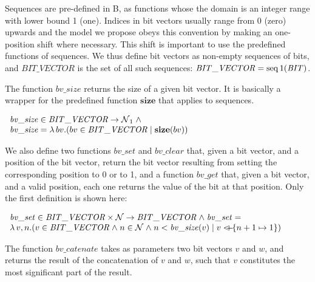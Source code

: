 \documentclass[11pt]{article} %
\begin{document}
Sequences are pre-defined in B, as functions whose the domain is an
integer range with lower bound 1 (one). Indices in bit vectors usually
range from 0 (zero) upwards and the model we propose obeys this
convention by making an one-position shift where necessary. This shift
is important to use the predefined functions of sequences. We thus
define bit vectors as non-empty sequences of bits, and
$\mathit{BIT\_VECTOR}$ is the set of all such sequences:
$\mathit{BIT\_VECTOR} = \mathop{\mathstrut{\rm seq}}\nolimits1(\mathit{BIT})$.

The function $\mathit{bv\_size}$ returns the size of a given bit vector. It is basically a wrapper for the
predefined function $\mathbf{size}$ that applies to sequences.

$
\begin{array}{l}
\mathit{bv\_size} \in \mathit{BIT\_VECTOR} \fun \nat_1 \land \\
\mathit{bv\_size} = \lambda bv . (bv \in \mathit{BIT\_VECTOR} \mid \mathbf{size}(bv))
\end{array}
$

We also define two functions $\mathit{bv\_set}$ and $\mathit{bv\_clear}$ that, given a bit vector, and a
position of the bit vector, return the bit vector resulting from setting the corresponding position to 0
or to 1, and a function $\mathit{bv\_get}$ that, given a bit vector, and a valid position, each one
returns the value of the bit at that position. Only the first definition is shown here:


$
\begin{array}{l}
\mathit{bv\_set} \in \mathit{BIT\_VECTOR} \times \nat \fun \mathit{BIT\_VECTOR} \land \mathit{bv\_set} =\\
\lambda v, n . (v \in \mathit{BIT\_VECTOR} \land n \in \nat \land n <\mathit{bv\_size}(v)
\mid v \lover \{ n+1 \mapsto 1 \})
\end{array}
$


The function $bv\_catenate$ takes as parameters two bit vectors $v$ and $w$, and returns the result of the
concatenation of $v$ and $w$, such that $v$ constitutes the most significant part of the result.


\end{document}

